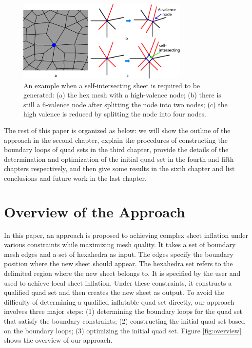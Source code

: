 \documentclass[final,5p,times,twocolumn]{elsarticle}
\begin{document}
\begin{figure}[htbp]
\begin{center}
\includegraphics[width=8.5cm]{intro_int_required.png}
\caption{An example when a self-intersecting sheet is required to be generated: (a) the hex mesh with a high-valence node; (b) there is still a 6-valence node after splitting the node into two nodes; (c) the high valence is reduced by splitting the node into four nodes.}
\label{fig:intro_int_required}
\end{center}
\end{figure}

The rest of this paper is organized as below: we will show the outline of the approach in the second chapter, explain the procedures of constructing the boundary loops of quad sets in the third chapter, provide the details of the determination and optimization of the initial quad set in the fourth and fifth chapters respectively, and then give some results in the sixth chapter and list conclusions and future work in the last chapter.

\section{Overview of the Approach}
\label{sec:algo_overview}

In this paper, an approach is proposed to achieving complex sheet inflation under various constraints while maximizing mesh quality. It takes a set of boundary mesh edges and a set of hexahedra as input. The edges specify the boundary position where the new sheet should appear. The hexahedra set refers to the delimited region where the new sheet belongs to. It is specified by the user and used to achieve local sheet inflation. Under these constraints, it constructs a qualified quad set and then creates the new sheet as output. To avoid the difficulty of determining a qualified inflatable quad set directly, our approach involves three major steps: (1) determining the boundary loops for the quad set that satisfy the boundary constraints; (2) constructing the initial quad set based on the boundary loops; (3) optimizing the initial quad set. Figure \ref{fig:overview} shows the overview of our approach.
\end{document}

